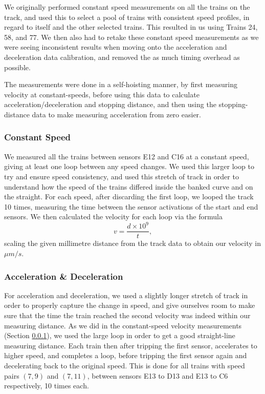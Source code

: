 \documentclass[12pt, titlepage]{article}
\begin{document}
    We originally performed constant speed measurements on all the trains on the track, and used this to select a pool of trains with consistent speed profiles, in regard to itself and the other selected trains. This resulted in us using Trains 24, 58, and 77. We then also had to retake these constant speed measurements as we were seeing inconsistent results when moving onto the acceleration and deceleration data calibration, and removed the as much timing overhead as possible.
    
    The measurements were done in a self-hoisting manner, by first measuring velocity at constant-speeds, before using this data to calculate acceleration/deceleration and stopping distance, and then using the stopping-distance data to make measuring acceleration from zero easier.

    \subsubsection{Constant Speed}
    \label{sec:constant-speed}
    
    We measured all the trains between sensors E12 and C16 at a constant speed, giving at least one loop between any speed changes. We used this larger loop to try and ensure speed consistency, and used this stretch of track in order to understand how the speed of the trains differed inside the banked curve and on the straight. For each speed, after discarding the first loop, we looped the track 10 times, measuring the time between the sensor activations of the start and end sensors. We then calculated the velocity for each loop via the formula
    \[
        v = \frac{d \times 10^9}{t},
    \]
    scaling the given millimetre distance from the track data to obtain our velocity in $\mu m / s$.
    
    \subsubsection{Acceleration \& Deceleration}
    \label{sec:accel-decel}
    
    For acceleration and deceleration, we used a slightly longer stretch of track in order to properly capture the change in speed, and give ourselves room to make sure that the time the train reached the second velocity was indeed within our measuring distance. As we did in the constant-speed velocity measurements (Section \ref{sec:constant-speed}), we used the large loop in order to get a good straight-line measuring distance. Each train then after tripping the first sensor, accelerates to higher speed, and completes a loop, before tripping the first sensor again and decelerating back to the original speed. This is done for all trains with speed pairs $(7, 9)$ and $(7, 11)$, between sensors E13 to D13 and E13 to C6 respectively, 10 times each. 
    
\end{document}
